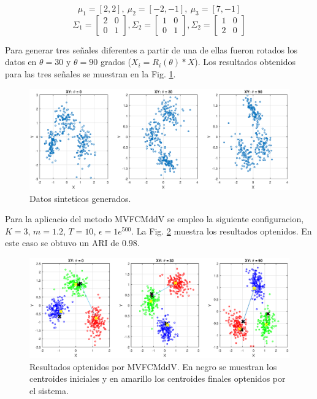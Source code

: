 \documentclass[12pt]{article}
\begin{document}
$$\mu_1 = [2, 2], \ \mu_2 = [-2, -1], \ \mu_3 = [7, -1] $$
$$\Sigma_1 = \left[ \begin{matrix}
2 & 0 \\ 
0 & 1
\end{matrix} \right], 
\Sigma_2 = \left[ \begin{matrix}
1 & 0 \\ 
0 & 1
\end{matrix} \right], 
\Sigma_2 = \left[ \begin{matrix}
1 & 0 \\ 
2 & 0
\end{matrix} \right] $$

Para generar tres señales diferentes a partir de una de ellas fueron rotados los datos en $\theta = 30$ y $\theta = 90$ grados ($X_i = R_i(\theta)*X$). Los resultados obtenidos para las tres señales se muestran en la Fig. \ref{fig:xy_sinteticos}.

\begin{figure}[h]
\centering
\includegraphics[width=4.5in]{../out/xy-sinteticos.eps}
\caption{Datos sinteticos generados.}
\label{fig:xy_sinteticos}
\end{figure}  

Para la aplicacio del metodo MVFCMddV se empleo la siguiente configuracion, $K = 3$, $m = 1.2$, $T = 10$, $\epsilon = 1e^{500}$. La Fig. \ref{fig:cluster_datos_sinteticos} muestra los resultados optenidos. En este caso se obtuvo un ARI de $0.98$.


\begin{figure}[h]
\centering
\includegraphics[width=4.5in]{../out/clusters-gauss-3.eps}
\caption{Resultados optenidos por MVFCMddV. En negro se muestran los centroides iniciales y en amarillo los centroides finales optenidos por el sistema.}
\label{fig:cluster_datos_sinteticos}
\end{figure}  
\end{document}
